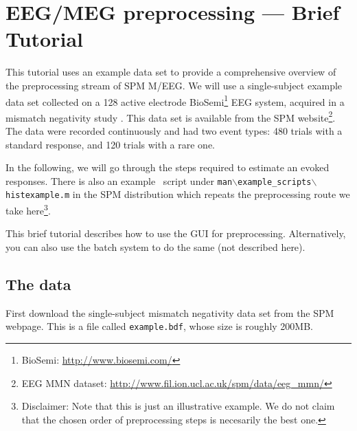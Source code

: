 \chapter{EEG/MEG preprocessing --- Brief Tutorial \label{Chap:eeg:tutorial}}

This tutorial uses an example data set to provide a comprehensive overview of the preprocessing stream of SPM M/EEG. We will use a single-subject example data set collected on a 128 active electrode BioSemi\footnote{BioSemi: \url{http://www.biosemi.com/}} EEG system, acquired in a mismatch negativity study \cite{mg_dcm_repro}. This data set is available from the SPM website\footnote{EEG MMN dataset: \url{http://www.fil.ion.ucl.ac.uk/spm/data/eeg\_mmn/}}. The data were recorded continuously and had two event types: 480 trials with a standard response, and 120 trials with a rare one.

In the following, we will go through the steps required to estimate an evoked responses. There is also an example \matlab\ script under \texttt{man$\backslash$example\_scripts$\backslash$histexample.m} in the SPM distribution which repeats the preprocessing route we take here\footnote{Disclaimer: Note that this is just an illustrative example. We do not claim that the chosen order of preprocessing steps is necesarily the best one.}.

This brief tutorial describes how to use the GUI for preprocessing. Alternatively, you can also use the batch system to do the same (not described here).

\section{The data}
First download the single-subject mismatch negativity data set from the SPM webpage\footnotemark[2]. This is a file called \texttt{example.bdf}, whose size is roughly 200MB.

